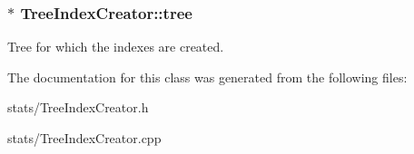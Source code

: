 \subsubsection[{\texorpdfstring{tree}{tree}}]{$\ast$ Tree\+Index\+Creator\+::tree\hspace{0.3cm}{\ttfamily [private]}}\hypertarget{class_tree_index_creator_ac3046a68c0fee8e750fecb785d47b08e}{}\label{class_tree_index_creator_ac3046a68c0fee8e750fecb785d47b08e}
Tree for which the indexes are created. 

The documentation for this class was generated from the following files\+:\begin{DoxyCompactItemize}
\item 
stats/Tree\+Index\+Creator.\+h\item 
stats/Tree\+Index\+Creator.\+cpp\end{DoxyCompactItemize}
